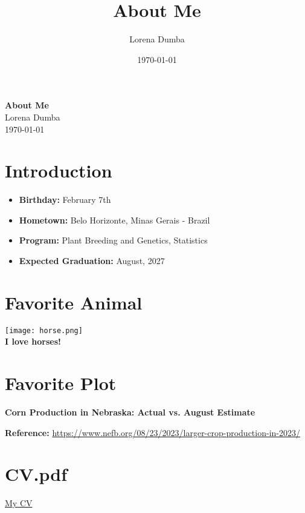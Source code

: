 \documentclass{article}
\title{About Me}
\author{Lorena Dumba}
\date{\today}
\begin{document}
\begin{center}
    \huge{\textbf{About Me}}\\
    \vspace{1cm}
    \Large{Lorena Dumba}\\
    \vspace{0.5cm}
    \large{\today}
\end{center}
\newpage

\section*{Introduction}
\begin{itemize}
    \item \textbf{Birthday:} February 7th
    \item \textbf{Hometown:} Belo Horizonte, Minas Gerais - Brazil
    \item \textbf{Program:} Plant Breeding and Genetics, Statistics
    \item \textbf{Expected Graduation:} August, 2027
\end{itemize}
\newpage

\section*{Favorite Animal}
\begin{center}
    \texttt{[image: horse.png]}\\
    \vspace{0.5cm}
    \textbf{I love horses!}
\end{center}
\newpage

\section*{Favorite Plot}

\begin{center}
    \textbf{Corn Production in Nebraska: Actual vs. August Estimate}
\end{center}

\begin{figure}[h!]
    \centering
\end{figure}

\begin{center}
    \textbf{Reference:} \url{https://www.nefb.org/08/23/2023/larger-crop-production-in-2023/}
\end{center}
\newpage

\section*{CV.pdf}
\begin{center}
    \href{CV.pdf}{My CV}
\end{center}
\end{document}
